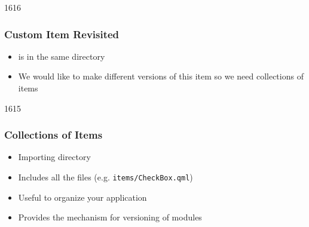 
\begin{slide}{1616}\frametitle{Custom Item Revisited}


\vspace*{0.5em}
\begin{itemize}
\item {} is in the same directory
\item We would like to make different versions of this item so we need collections of items
\end{itemize}

\end{slide}


\begin{slide}{1615}\frametitle{Collections of Items}


\begin{itemize}
\item Importing  directory
\item Includes all the files (e.g. \texttt{items/CheckBox.qml})
\item Useful to organize your application
\item Provides the mechanism for versioning of modules
\end{itemize}


\end{slide}


